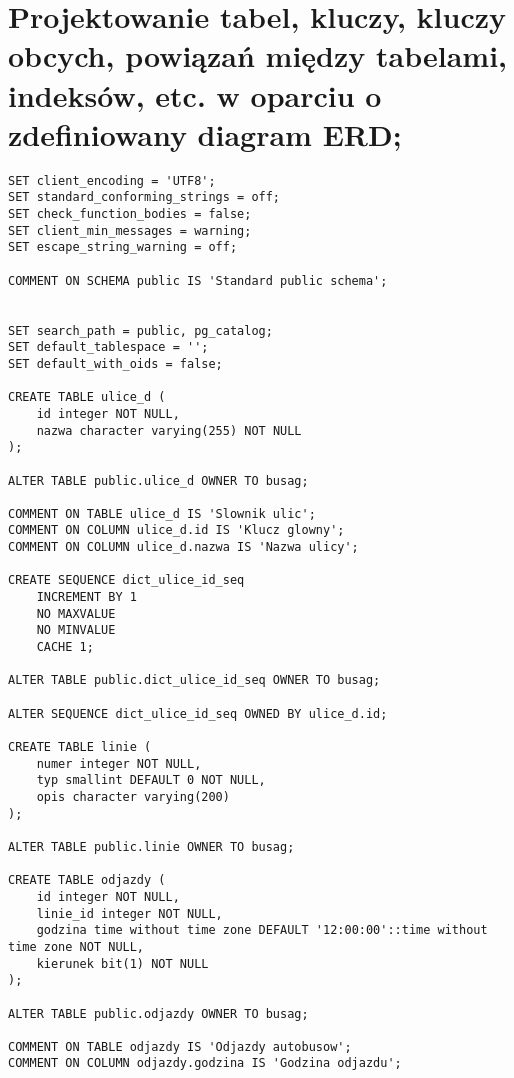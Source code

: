 \section{Projektowanie tabel, kluczy, kluczy obcych, powiązań między tabelami, indeksów, etc. w oparciu o zdefiniowany diagram ERD;} 



\begin{lstlisting}
SET client_encoding = 'UTF8';
SET standard_conforming_strings = off;
SET check_function_bodies = false;
SET client_min_messages = warning;
SET escape_string_warning = off;

COMMENT ON SCHEMA public IS 'Standard public schema';


SET search_path = public, pg_catalog;
SET default_tablespace = '';
SET default_with_oids = false;

CREATE TABLE ulice_d (
    id integer NOT NULL,
    nazwa character varying(255) NOT NULL
);

ALTER TABLE public.ulice_d OWNER TO busag;

COMMENT ON TABLE ulice_d IS 'Slownik ulic';
COMMENT ON COLUMN ulice_d.id IS 'Klucz glowny';
COMMENT ON COLUMN ulice_d.nazwa IS 'Nazwa ulicy';

CREATE SEQUENCE dict_ulice_id_seq
    INCREMENT BY 1
    NO MAXVALUE
    NO MINVALUE
    CACHE 1;

ALTER TABLE public.dict_ulice_id_seq OWNER TO busag;

ALTER SEQUENCE dict_ulice_id_seq OWNED BY ulice_d.id;

CREATE TABLE linie (
    numer integer NOT NULL,
    typ smallint DEFAULT 0 NOT NULL,
    opis character varying(200)
);

ALTER TABLE public.linie OWNER TO busag;

CREATE TABLE odjazdy (
    id integer NOT NULL,
    linie_id integer NOT NULL,
    godzina time without time zone DEFAULT '12:00:00'::time without time zone NOT NULL,
    kierunek bit(1) NOT NULL
);

ALTER TABLE public.odjazdy OWNER TO busag;

COMMENT ON TABLE odjazdy IS 'Odjazdy autobusow';
COMMENT ON COLUMN odjazdy.godzina IS 'Godzina odjazdu';


\end{lstlisting}

